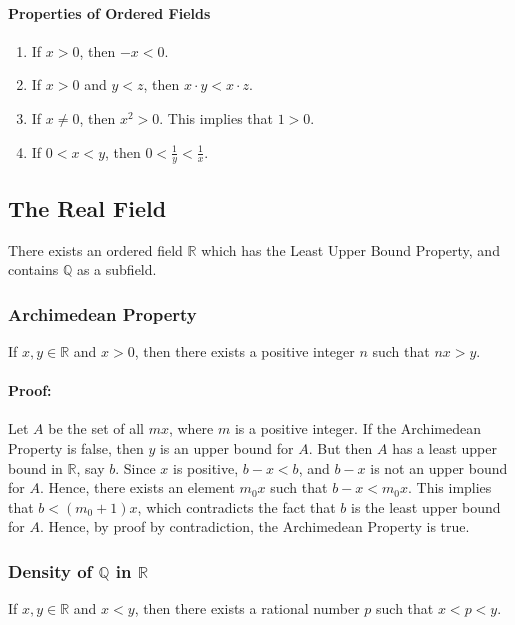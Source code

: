 \documentclass[12pt, oneside]{book}
\begin{document}
\paragraph{Properties of Ordered Fields}
\begin{enumerate}
	\item If \(x > 0\), then \(-x < 0\).
	\item If \(x > 0\) and \(y < z\), then \(x \cdot y < x \cdot z\).
	\item If \(x \neq 0\), then \(x^2 > 0\).
	      This implies that \(1 > 0\).
	\item If \(0 < x < y\), then \(0 < \frac{1}{y} < \frac{1}{x}\).
\end{enumerate}

\subsection{The Real Field}
There exists an ordered field \(\mathbb{R}\) which has the Least Upper Bound Property, and contains \(\mathbb{Q}\) as a subfield.

\subsubsection{Archimedean Property}
If \(x,y \in \mathbb{R}\) and \(x > 0\), then there exists a positive integer \(n\) such that \(nx > y\).

\paragraph{Proof:} Let \(A\) be the set of all \(mx\), where \(m\) is a positive integer.
If the Archimedean Property is false, then \(y\) is an upper bound for \(A\).
But then \(A\) has a least upper bound in \( \mathbb{R} \), say \(b\).
Since \(x\) is positive, \(b-x<b\), and \(b-x\) is not an upper bound for \(A\).
Hence, there exists an element \(m_0x\) such that \(b-x < m_0x\).
This implies that \(b < (m_0+1)x\), which contradicts the fact that \(b\) is the least upper bound for \(A\).
Hence, by proof by contradiction, the Archimedean Property is true.

\subsubsection{Density of \(\mathbb{Q}\) in \(\mathbb{R}\)}
If \(x,y \in \mathbb{R}\) and \(x < y\), then there exists a rational number \(p\) such that \(x < p < y\).
\end{document}

